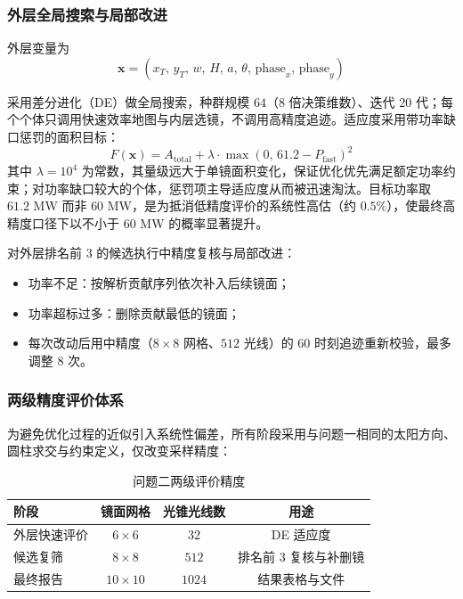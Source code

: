\documentclass[12pt,a4paper,fontset=fandol]{ctexart}
\begin{document}
\subsubsection{外层全局搜索与局部改进}

外层变量为
\begin{equation}
    \mathbf{x} = (x_T,\, y_T,\, w,\, H,\, a,\, \theta,\, \mathrm{phase}_x,\, \mathrm{phase}_y)
    \label{eq:q2_de_var}
\end{equation}

采用差分进化（DE）做全局搜索，种群规模 $64$（$8$ 倍决策维数）、迭代 $20$ 代；每个个体只调用快速效率地图与内层选镜，不调用高精度追迹。适应度采用带功率缺口惩罚的面积目标：
\begin{equation}
    F(\mathbf{x}) = A_{\mathrm{total}} + \lambda \cdot \max\left(0,\, 61.2 - P_{\mathrm{fast}}\right)^2
    \label{eq:q2_fitness}
\end{equation}
其中 $\lambda = 10^{4}$ 为常数，其量级远大于单镜面积变化，保证优化优先满足额定功率约束；对功率缺口较大的个体，惩罚项主导适应度从而被迅速淘汰。目标功率取 $61.2$ MW 而非 $60$ MW，是为抵消低精度评价的系统性高估（约 $0.5\%$），使最终高精度口径下以不小于 $60$ MW 的概率显著提升。

对外层排名前 $3$ 的候选执行中精度复核与局部改进：
\begin{itemize}
    \item 功率不足：按解析贡献序列依次补入后续镜面；
    \item 功率超标过多：删除贡献最低的镜面；
    \item 每次改动后用中精度（$8\times8$ 网格、$512$ 光线）的 60 时刻追迹重新校验，最多调整 8 次。
\end{itemize}

\subsubsection{两级精度评价体系}

为避免优化过程的近似引入系统性偏差，所有阶段采用与问题一相同的太阳方向、圆柱求交与约束定义，仅改变采样精度：

\begin{table}[H]
    \centering
    \small
    \caption{问题二两级评价精度}
    \label{tab:q2_precision}
    \begin{tabular}{lccc}
        \toprule
        阶段 & 镜面网格 & 光锥光线数 & 用途 \\
        \midrule
        外层快速评价 & $6\times6$ & $32$ & DE 适应度 \\
        候选复筛 & $8\times8$ & $512$ & 排名前 3 复核与补删镜 \\
        最终报告 & $10\times10$ & $1024$ & 结果表格与文件 \\
        \bottomrule
    \end{tabular}
\end{table}
\end{document}
